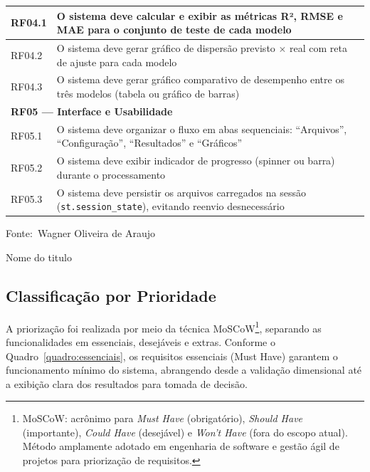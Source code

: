 \documentclass[12pt,a4paper]{article}
\newcommand{\oautor}{Wagner Oliveira de Araujo}
\begin{document}
\begin{quadro}[ht]
\begin{threeparttable}
\begin{tabularx}{\textwidth}{|l|X|}
RF04.1 & O sistema deve calcular e exibir as métricas R², RMSE e MAE para o conjunto de teste de cada modelo \\ \hline
RF04.2 & O sistema deve gerar gráfico de dispersão previsto $\times$ real com reta de ajuste para cada modelo \\ \hline
RF04.3 & O sistema deve gerar gráfico comparativo de desempenho entre os três modelos (tabela ou gráfico de barras) \\ \hline
\multicolumn{2}{|l|}{\textbf{RF05 --- Interface e Usabilidade}} \\ \hline
RF05.1 & O sistema deve organizar o fluxo em abas sequenciais: ``Arquivos'', ``Configuração'', ``Resultados'' e ``Gráficos'' \\ \hline
RF05.2 & O sistema deve exibir indicador de progresso (spinner ou barra) durante o processamento \\ \hline
RF05.3 & O sistema deve persistir os arquivos carregados na sessão (\texttt{st.session\_state}), evitando reenvio desnecessário \\ \hline
\end{tabularx}
\begin{tablenotes}[flushleft]
\footnotesize
\item Fonte:~\oautor
\end{tablenotes}
\end{threeparttable}
\end{quadro}

\begin{frame}[fragile]{Nome do titulo}


\end{frame}

\newpage
\subsection{Classificação por Prioridade}

A priorização foi realizada por meio da técnica MoSCoW\footnote{MoSCoW: acrônimo para \textit{Must Have} (obrigatório), \textit{Should Have} (importante), \textit{Could Have} (desejável) e \textit{Won't Have} (fora do escopo atual). Método amplamente adotado em engenharia de software e gestão ágil de projetos para priorização de requisitos.}, separando as funcionalidades em essenciais, desejáveis e extras. Conforme o Quadro~\ref{quadro:essenciais}, os requisitos essenciais (Must Have) garantem o funcionamento mínimo do sistema, abrangendo desde a validação dimensional até a exibição clara dos resultados para tomada de decisão.
\end{document}
